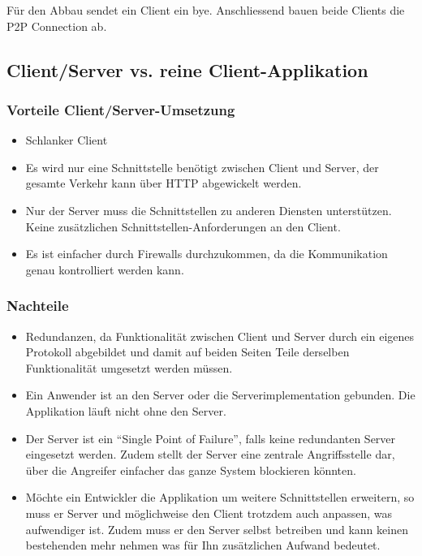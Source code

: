	Für den Abbau sendet ein Client ein bye. Anschliessend bauen beide Clients die P2P Connection ab.
	
	
	\subsection{Client/Server vs. reine Client-Applikation}
		\subsubsection{Vorteile Client/Server-Umsetzung}
		\begin{itemize}
			\item Schlanker Client
			\item Es wird nur eine Schnittstelle benötigt zwischen Client und Server, der gesamte Verkehr kann über HTTP abgewickelt werden.
			\item Nur der Server muss die Schnittstellen zu anderen Diensten
			unterstützen. Keine zusätzlichen Schnittstellen-Anforderungen an den Client.
			\item Es ist einfacher durch Firewalls durchzukommen, da die Kommunikation genau kontrolliert werden kann.
		\end{itemize}
		\subsubsection{Nachteile}
		\begin{itemize}
			\item Redundanzen, da Funktionalität zwischen Client und Server durch
			ein eigenes Protokoll abgebildet und damit auf beiden Seiten Teile derselben
			Funktionalität umgesetzt werden müssen.
			\item Ein Anwender ist an den Server oder die Serverimplementation gebunden.
			Die Applikation läuft nicht ohne den Server.
			\item Der Server ist ein "`Single Point of Failure"', falls keine redundanten Server eingesetzt werden. Zudem stellt der Server eine zentrale Angriffsstelle dar, über die Angreifer einfacher das ganze System blockieren könnten.
			\item Möchte ein Entwickler die Applikation um weitere Schnittstellen erweitern, so muss er Server und möglichweise den Client trotzdem auch anpassen, was aufwendiger ist. Zudem muss er den Server selbst betreiben und kann keinen bestehenden mehr nehmen was für Ihn zusätzlichen Aufwand bedeutet.
		\end{itemize}


